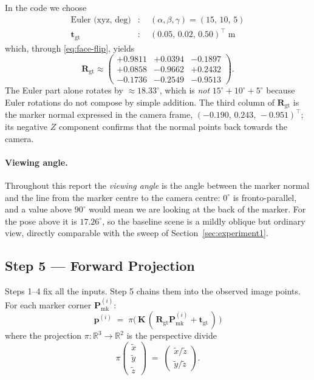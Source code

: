 \documentclass[11pt,a4paper]{article}
\theoremstyle{definition}
\theoremstyle{plain}
\theoremstyle{remark}
\newcommand{\R}{\mathbb{R}}
\newcommand{\Rgt}{\mathbf{R}_{\text{gt}}}
\newcommand{\tgt}{\mathbf{t}_{\text{gt}}}
\newcommand{\Pmark}{\mathbf{P}_{\text{mk}}}
\newcommand{\KK}{\mathbf{K}}
\begin{document}
In the code we choose
\begin{align}
  \text{Euler (xyz, deg)} & : \quad (\alpha, \beta, \gamma) = (15,\,10,\,5) \\
  \tgt & : \quad (0.05,\, 0.02,\, 0.50)^\top \;\text{m}
\end{align}
which, through \eqref{eq:face-flip}, yields
\[
  \Rgt \approx
  \begin{pmatrix}
    +0.9811 & +0.0394 & -0.1897 \\
    +0.0858 & -0.9662 & +0.2432 \\
    -0.1736 & -0.2549 & -0.9513
  \end{pmatrix}.
\]
The Euler part alone rotates by $\approx 18.33^\circ$, which is \emph{not}
$15^\circ + 10^\circ + 5^\circ$ because Euler rotations do not compose by
simple addition. The third column of $\Rgt$ is the marker normal expressed in
the camera frame, $(-0.190,\, 0.243,\, -0.951)^\top$; its negative $Z$
component confirms that the normal points back towards the camera.

\paragraph{Viewing angle.} Throughout this report the \emph{viewing angle} is
the angle between the marker normal and the line from the marker centre to the
camera centre: $0^\circ$ is fronto-parallel, and a value above $90^\circ$
would mean we are looking at the back of the marker. For the pose above it is
$17.26^\circ$, so the baseline scene is a mildly oblique but ordinary view,
directly comparable with the sweep of Section~\ref{sec:experiment1}.

\subsection{Step 5 --- Forward Projection}

Steps 1--4 fix all the inputs. Step 5 chains them into the observed image
points. For each marker corner $\Pmark^{(i)}$:
\begin{equation}
  \boxed{\quad
    \mathbf{p}^{(i)}
    \;=\;
    \pi\!\Big(\, \KK\,(\,\Rgt \Pmark^{(i)} + \tgt\,) \,\Big)
  \quad}
  \label{eq:full-projection}
\end{equation}
where the projection $\pi:\R^3 \to \R^2$ is the perspective divide
\begin{equation}
  \pi\!\begin{pmatrix} \tilde x \\ \tilde y \\ \tilde z \end{pmatrix}
  \;=\;
  \begin{pmatrix} \tilde x / \tilde z \\ \tilde y / \tilde z \end{pmatrix}.
\end{equation}
\end{document}

